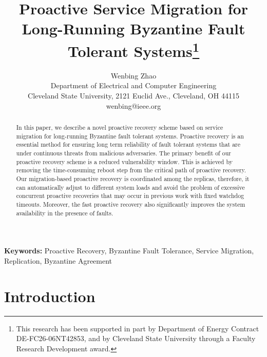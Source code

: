 \documentclass[times, 10pt, twocolumn]{article}
\begin{document}
\title{Proactive Service Migration for Long-Running Byzantine Fault Tolerant Systems\thanks{This research has been
       supported in part by Department of Energy 
Contract DE-FC26-06NT42853, and by Cleveland State University 
through a Faculty Research Development award.}}
       \author{Wenbing Zhao \\
       Department of Electrical and Computer Engineering \\ Cleveland
       State University, 2121 Euclid Ave., Cleveland, OH 44115\\
       wenbing@ieee.org} \date{} \maketitle
\thispagestyle{empty}

\begin{abstract}
In this paper, we describe a novel proactive recovery scheme based on service 
migration for long-running Byzantine fault tolerant systems. Proactive 
recovery is an essential method for ensuring long term reliability of 
fault tolerant systems that are under continuous threats from malicious 
adversaries. The primary benefit of our proactive recovery scheme is a 
reduced vulnerability window. This is achieved by removing the time-consuming 
reboot step from the critical path of proactive recovery. Our migration-based
proactive recovery is coordinated among the replicas, therefore, it can 
automatically adjust to different system loads and avoid the problem of
excessive concurrent proactive recoveries that may occur in previous work
with fixed watchdog timeouts. Moreover, the fast proactive recovery also 
significantly improves the system availability in the presence of faults.
\end{abstract}





\noindent
{\bf Keywords:} Proactive Recovery, Byzantine Fault Tolerance, Service Migration, Replication, Byzantine Agreement

\section{Introduction}
\end{document}
